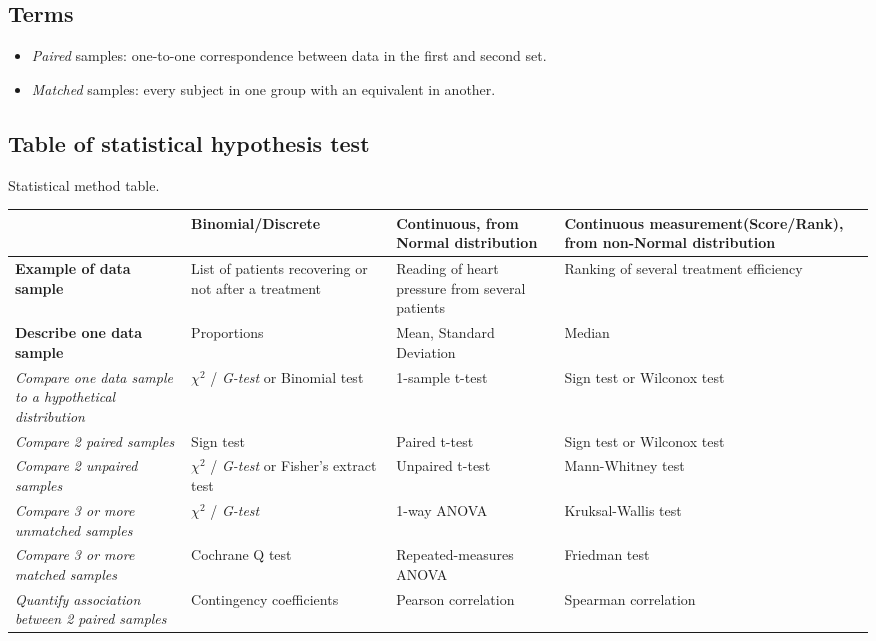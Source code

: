 \subsection{Terms}
\begin{itemize}
    \item \emph{Paired} samples: one-to-one correspondence between data in the first and
        second set.
    \item \emph{Matched} samples: every subject in one group with an equivalent in 
        another.
\end{itemize}


\subsection{Table of statistical hypothesis test}
\label{statistical_method_table}{Statistical method table.}\\ 
\begin{tabular}{|*{4}{b{4cm}|}}
\hline
& \textbf{Binomial/Discrete} & \textbf{Continuous, from Normal distribution} & 
\textbf{Continuous measurement\newline (Score/Rank), from non-Normal distribution} \\
\hline
    \textbf{Example of data sample} & List of patients recovering or not after a 
    treatment & Reading of heart pressure from several patients & Ranking of several
    treatment efficiency\\
\hline
    \textbf{Describe one data sample} & Proportions & Mean, Standard Deviation & Median \\
    \hline
    \emph{Compare one data sample to a hypothetical distribution} & $\chi^{2}$ / \emph{G-test} or \label{binomial_test}{Binomial test} & 1-sample t-test & Sign test or Wilconox test \\
    \hline
    \emph{Compare 2 paired samples} & Sign test & Paired t-test & Sign test or Wilconox test \\
    \hline
    \emph{Compare 2 unpaired samples} & $\chi^{2}$ / \emph{G-test} or Fisher's extract test & Unpaired t-test & Mann-Whitney test \\
    \hline
    \emph{Compare 3 or more unmatched samples} & $\chi^{2}$ / \emph{G-test} & 1-way ANOVA & Kruksal-Wallis test \\
    \hline
    \emph{Compare 3 or more matched samples} & Cochrane Q test & Repeated-measures ANOVA & Friedman test\\
    \hline
    \emph{Quantify association between 2 paired samples} & Contingency coefficients & Pearson correlation & Spearman correlation \\
    \hline
\end{tabular}

